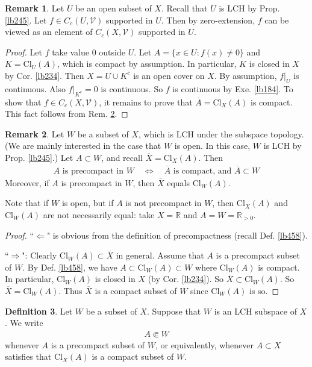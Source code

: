 \documentclass[12pt,b5paper,notitlepage]{article}
\theoremstyle{definition}
\newtheorem{df}{Definition}[section]
\newtheorem{rem}[df]{Remark}
\theoremstyle{plain}
\newcommand{\mc}{\mathcal}
\newcommand{\ovl}{\overline}
\newcommand{\Rbb}{\mathbb R}
\newcommand{\Cl}{\mathrm{Cl}}
\numberwithin{equation}{section}
\begin{document}
\begin{rem}\label{lb457}
Let $U$ be an open subset of $X$. Recall that $U$ is LCH by Prop. \ref{lb245}. Let $f\in C_c(U,\mc V)$ supported in $U$. Then by zero-extension, $f$ can be viewed as an element of $C_c(X,\mc V)$ supported in $U$. 
\end{rem}


\begin{proof}
Let $f$ take value $0$ outside $U$. Let  $A=\{x\in U:f(x)\neq 0\}$ and $K=\Cl_U(A)$, which is compact by assumption. In particular, $K$ is closed in $X$ by Cor. \ref{lb234}. Then $X=U\cup K^c$ is an open cover on $X$. By assumption, $f|_U$ is continuous. Also $f|_{K^c}=0$ is continuous. So $f$ is continuous by Exe. \ref{lb184}. To show that $f\in C_c(X,\mc V)$, it remains to prove that $\ovl A=\Cl_X(A)$ is compact. This fact follows from Rem. \ref{lb459}.
\end{proof}



\begin{rem}\label{lb459}
Let $W$ be a subset of $X$, which is LCH under the subspace topology. (We are mainly interested in the case that $W$ is open. In this case, $W$ is LCH by Prop. \ref{lb245}.)  Let $A\subset W$, and recall $\ovl X=\Cl_X(A)$. Then
\begin{align}\label{eq196}
A\text{ is precompact in }W\quad\Longleftrightarrow\quad \ovl A\text{ is compact, and }\ovl A\subset W
\end{align}
Moreover, if $A$ is precompact in $W$, then $\ovl X$ equals $\Cl_W(A)$.
\end{rem}

Note that if $W$ is open, but if $A$ is not precompact in $W$, then $\Cl_X(A)$ and $\Cl_W(A)$ are not necessarily equal: take $X=\Rbb$ and $A=W=\Rbb_{>0}$.

\begin{proof}
``$\Leftarrow$" is obvious from the definition of precompactness (recall Def. \ref{lb458}).

``$\Rightarrow$": Clearly $\Cl_W(A)\subset\ovl X$ in general. Assume that $A$ is a precompact subset of $W$. By Def. \ref{lb458}, we have $A\subset\Cl_W(A)\subset W$ where $\Cl_W(A)$ is compact. In particular, $\Cl_W(A)$ is closed in $X$ (by Cor. \ref{lb234}). So $\ovl X\subset\Cl_W(A)$. So $\ovl X=\Cl_W(A)$. Thus $\ovl X$ is a compact subset of $W$ since $\Cl_W(A)$ is so.
\end{proof}


\begin{df}
Let $W$ be a subset of $X$. Suppose that $W$ is an LCH subspace of $X$. We write 
\begin{align}
A\Subset W
\end{align}
whenever $A$ is a precompact subset of $W$, or equivalently, whenever $A\subset X$ satisfies that $\Cl_X(A)$ is a compact subset of $W$.
\end{df}
\end{document}
